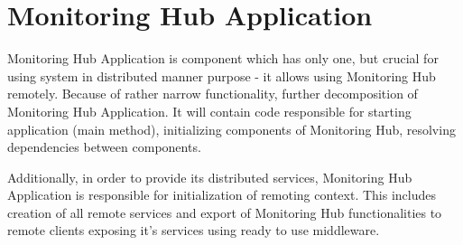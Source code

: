 %


\section{Monitoring Hub Application}
\label{sec:arch_monitoring_hub_application}

Monitoring Hub Application is component which has only one, but crucial for using system in distributed manner purpose -
it allows using Monitoring Hub remotely. Because of rather narrow functionality, further decomposition of Monitoring Hub
Application. It will contain code responsible for starting application (main method), initializing components of
Monitoring Hub, resolving dependencies between components.

Additionally, in order to provide its distributed services, Monitoring Hub Application is responsible for
initialization of remoting context. This includes creation of all remote services and export of Monitoring Hub
functionalities to remote clients exposing it's services using ready to use middleware. 
